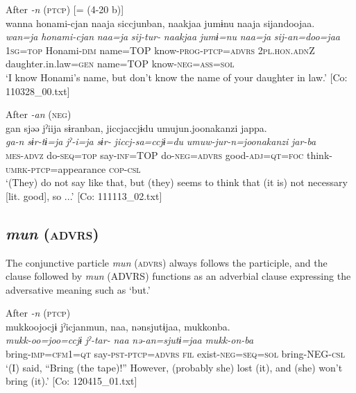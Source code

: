 \ea\label{ex:10.30} 
\ea After \textit{-n} (\textsc{ptcp}) [= (4-20 b)]\\
      \glll    wanna  honami-{\textbar}cjan{\textbar}  naaja  siccjunban, naakjaa  jumɨnu  naaja  sijandoojaa.\\
    \textit{wan=ja}  \textit{honami-cjan}  \textit{naa=ja}  \textit{sij-tur-}  \textit{naakjaa}  \textit{jumɨ=nu}  \textit{naa=ja}  \textit{sij-an=doo=jaa}\\
    1\textsc{sg}=\textsc{top}  Honami-\textsc{dim}  name=TOP  know-\textsc{prog}-\textsc{ptcp}=\textsc{advrs}  2\textsc{pl}.\textsc{hon}.\textsc{adn}Z  daughter.in.law=\textsc{gen}  name=TOP  know-\textsc{neg}=\textsc{ass}=\textsc{sol}\\
\glt     ‘I know Honami’s name, but don’t know the name of your daughter in law.’  [Co: 110328\_00.txt]

  \ex After \textit{-an} (\textsc{neg})\\
      \glll    gan  sjəə  jˀiija  sɨranban,  jiccjaccjɨdu  umujun.{\textbar}joonakanzi{\textbar}  jappa.\\
    \textit{ga-n}  \textit{sɨr-tɨ=ja}  \textit{jˀ-i=ja}  \textit{sɨr-}     \textit{jiccj-sa=ccjɨ=du}  \textit{umuw-jur-n=joonakanzi}  \textit{jar-ba}\\
    \textsc{mes}-\textsc{advz}  do-\textsc{seq}=\textsc{top}  say-\textsc{inf}=TOP  do-\textsc{neg}=\textsc{advrs}  good-\textsc{adj}=\textsc{qt}=\textsc{foc}  think-\textsc{umrk}-\textsc{ptcp}=appearance  \textsc{cop}-\textsc{csl}\\
\glt     ‘(They) do not say like that, but (they) seems to think that (it is) not necessary [lit. good], so ...’  [Co: 111113\_02.txt]
\z
\z

\subsection{\textit{mun} (\textsc{advrs})}\label{sec:10.2.2}

The conjunctive particle \textit{mun} (\textsc{advrs}) always follows the participle, and the clause followed by \textit{mun} (ADVRS) functions as an adverbial clause expressing the adversative meaning such as ‘but.’

\ea\label{ex:10.31}  
  \ea
  \exi{} After \textit{{}-n} (\textsc{ptcp})\\
  \ex  %
      \glll    mukkoojocjɨ  jˀicjanmun,  naa,  nənsjutɨjaa,  mukkonba.      \\
      \textit{mukk-oo=joo=ccjɨ}  \textit{jˀ-tar-}  \textit{naa}  \textit{nə-an=sjutɨ=jaa}    \textit{mukk-on-ba}      \\
      bring-\textsc{imp}=\textsc{cfm}1=\textsc{qt}  say-\textsc{pst}-\textsc{ptcp}=\textsc{advrs}  \textsc{fil}  exist-\textsc{neg}=\textsc{seq}=\textsc{sol}   bring-NEG-\textsc{csl}     \\
      \glt       ‘(I) said, “Bring (the tape)!” However, (probably she) lost (it), and (she) won’t bring (it).’ [Co: 120415\_01.txt]

